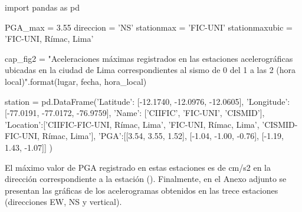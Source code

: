 \documentclass[11pt, a4paper]{report}
\begin{document}
\begin{pycode}
import pandas as pd

PGA_max = 3.55
direccion = 'NS'
stationmax = 'FIC-UNI'
stationmaxubic = 'FIC-UNI, Rímac, Lima'

cap_fig2 = "Aceleraciones máximas registrados en las estaciones acelerográficas ubicadas en la ciudad de Lima correspondientes al sismo de {0} del {1} a las {2} (hora local)".format(lugar, fecha, hora_local)

station = pd.DataFrame({'Latitude': [-12.1740, -12.0976, -12.0605], 
                        'Longitude': [-77.0191, -77.0172, -76.9759], 
                        'Name': ['CIIFIC', 'FIC-UNI', 'CISMID'], 
                        'Location':['CIIFIC-FIC-UNI, Rímac, Lima', 'FIC-UNI, Rímac, Lima', 'CISMID-FIC-UNI, Rímac, Lima'],
                        'PGA':[[3.54, 3.55, 1.52], [-1.04, -1.00, -0.76], [-1.19, 1.43, -1.07]]
                        })

\end{pycode}

\newpage
\noindent
El máximo valor de PGA registrado en estas estaciones es de  cm/s2 en la dirección  
correspondiente a la estación  ().
Finalmente, en el Anexo adjunto se presentan las gráficas de los acelerogramas obtenidos 
en las trece estaciones (direcciones EW, NS y vertical).
\end{document}
